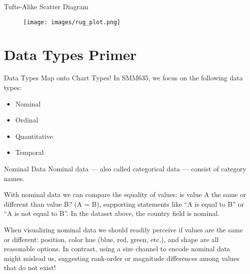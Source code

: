 \documentclass[notes, aspectratio=1610]{beamer}
\begin{document}
\begin{frame}{Tufte-Alike Scatter Diagram}{}
\begin{figure}
		\begin{center}
			\texttt{[image: images/rug\_plot.png]}
		\end{center}
	\end{figure}

\end{frame}

\section{Data Types Primer}

\begin{frame}{Data Types Map onto Chart Types!}{}
In SMM635, we focus on the following data types:
\begin{itemize}
	\item Nominal
	\item Ordinal 
	\item Quantitative
	\item Temporal
\end{itemize}
\end{frame}

\begin{frame}{Nominal Data}
	\small
	Nominal data — also called categorical data — consist of category names.

	\vspace{1em}

	With nominal data we can compare the equality of values: is value A the same or different than value B? (A = B), supporting statements like “A is equal to B” or “A is not equal to B”. In the dataset above, the country field is nominal.
	
	\vspace{1em}

	When visualizing nominal data we should readily perceive if values are
	the same or different: position, color hue (blue, red, green, etc.), and
	shape are all reasonable options. In contrast, using a size channel to
	encode nominal data might mislead us, suggesting rank-order or magnitude
	differences among values that do not exist!
\end{frame}
\end{document}
